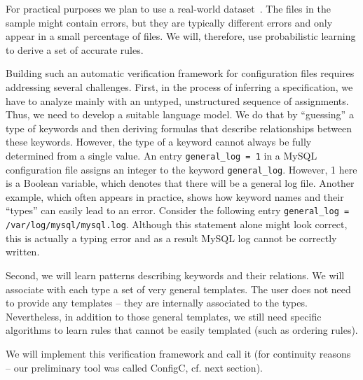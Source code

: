 For practical purposes we plan to use a real-world dataset~\cite{configdataset}. The 
files in the sample might contain
errors, but they are typically different errors and only appear in a small percentage of 
files. We will, therefore, use probabilistic learning to derive a set of accurate rules. 

Building such an automatic verification framework for
configuration files requires addressing several challenges. 
First, in the process of inferring a specification, we have to 
analyze mainly with an untyped, unstructured sequence of assignments.
Thus, we need to develop a suitable language model. We do that by 
``guessing'' a type of keywords and then deriving formulas that
describe relationships between these keywords. However, the
type of a keyword cannot always be fully determined 
from a single value. 
An entry {\tt general\_log = 1} in a MySQL configuration file assigns an integer to the 
keyword {\tt general\_log}. However, 1 here is a Boolean variable,
which denotes that there will be a general log file.
Another example, which often appears in practice, shows how keyword names and 
their ``types'' can easily lead to an error. Consider the
following entry {\tt general\_log = /var/log/mysql/mysql.log}. Although this statement 
alone might look correct, this is actually a typing error and as a result MySQL log cannot be correctly written.

Second, we will learn patterns describing keywords and their relations. We will associate with each type a set of very general templates. The user does not need to provide any templates -- they are internally associated to the types.
Nevertheless, in addition to those general templates, we still need specific algorithms to learn
rules that cannot be easily templated (such as ordering rules). 

We will implement this verification framework and call it \app (for continuity reasons
-- our preliminary tool was called ConfigC, cf. next section).
